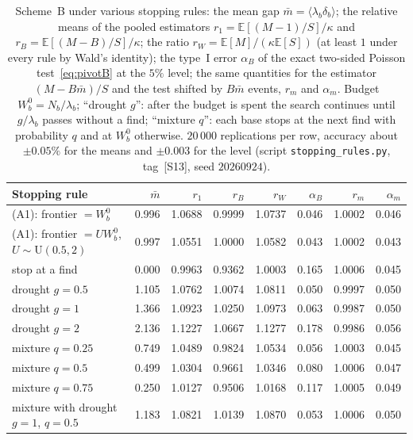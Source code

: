 \documentclass[11pt,a4paper]{article}
\theoremstyle{plain}
\theoremstyle{remark}
\begin{document}
\begin{table}[t]
\centering
\caption{Scheme~B under various stopping rules: the mean gap
$\bar m=\langle\lambda_b\delta_b\rangle$; the relative means of the pooled
estimators $r_1=\mathbb E[(M-1)/S]/\kappa$ and $r_B=\mathbb E[(M-B)/S]/\kappa$; the
ratio $r_W=\mathbb E[M]/(\kappa\mathbb E[S])$ (at least $1$ under every rule by Wald's
identity); the type~I error $\alpha_B$ of the exact two-sided Poisson
test~\eqref{eq:pivotB} at the $5\%$ level; the same quantities for the estimator
$(M-B\bar m)/S$ and the test shifted by $B\bar m$ events, $r_m$ and $\alpha_m$.
Budget $W^0_b=N_b/\lambda_b$; ``drought $g$'': after the budget is spent the
search continues until $g/\lambda_b$ passes without a find; ``mixture $q$'': each
base stops at the next find with probability $q$ and at $W^0_b$ otherwise.
$20\,000$ replications per row, accuracy about $\pm0.05\%$ for the means and
$\pm0.003$ for the level (script \texttt{stopping\_rules.py}, tag~[S13], seed
$20260924$).}
\label{tab:stop}
\small
\setlength{\tabcolsep}{4pt}
\begin{tabular}{lrrrrrrr}
\toprule
Stopping rule & $\bar m$ & $r_1$ & $r_B$ & $r_W$ & $\alpha_B$ & $r_m$ & $\alpha_m$\\
\midrule
(A1): frontier $=W^0_b$ & 0.996 & 1.0688 & 0.9999 & 1.0737 & 0.046 & 1.0002 & 0.046\\
(A1): frontier $=UW^0_b$, $U\sim\mathrm U(0.5,2)$ & 0.997 & 1.0551 & 1.0000 & 1.0582 & 0.043 & 1.0002 & 0.043\\
stop at a find & 0.000 & 0.9963 & 0.9362 & 1.0003 & 0.165 & 1.0006 & 0.045\\
drought $g=0.5$ & 1.105 & 1.0762 & 1.0074 & 1.0811 & 0.050 & 0.9997 & 0.050\\
drought $g=1$ & 1.366 & 1.0923 & 1.0250 & 1.0973 & 0.063 & 0.9987 & 0.050\\
drought $g=2$ & 2.136 & 1.1227 & 1.0667 & 1.1277 & 0.178 & 0.9986 & 0.056\\
\midrule
mixture $q=0.25$ & 0.749 & 1.0489 & 0.9824 & 1.0534 & 0.056 & 1.0003 & 0.045\\
mixture $q=0.5$ & 0.499 & 1.0304 & 0.9661 & 1.0346 & 0.080 & 1.0006 & 0.047\\
mixture $q=0.75$ & 0.250 & 1.0127 & 0.9506 & 1.0168 & 0.117 & 1.0005 & 0.049\\
mixture with drought $g=1$, $q=0.5$ & 1.183 & 1.0821 & 1.0139 & 1.0870 & 0.053 & 1.0006 & 0.050\\
\bottomrule
\end{tabular}
\end{table}
\end{document}
